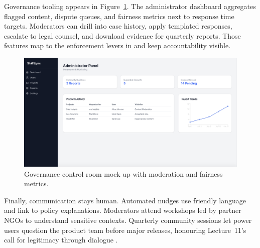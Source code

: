 Governance tooling appears in Figure~\ref{fig:admin-panel}. The administrator dashboard aggregates flagged content, dispute queues, and fairness metrics next to response time targets. Moderators can drill into case history, apply templated responses, escalate to legal counsel, and download evidence for quarterly reports. Those features map to the enforcement levers in \citet{Reillier2017} and keep accountability visible.

\begin{figure}[H]
  \centering
  \includegraphics[width=0.85\linewidth]{figures/Organisation-Administratorpanel.png}
  \caption{Governance control room mock up with moderation and fairness metrics.}
  \label{fig:admin-panel}
\end{figure}

Finally, communication stays human. Automated nudges use friendly language and link to policy explanations. Moderators attend workshops led by partner NGOs to understand sensitive contexts. Quarterly community sessions let power users question the product team before major releases, honouring Lecture~11's call for legitimacy through dialogue \citep{Lecture11}.
